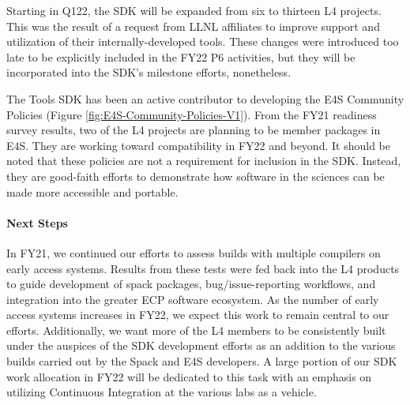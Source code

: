 Starting in Q122, the SDK will be expanded from six to thirteen L4 projects. This was the result of a request from LLNL affiliates to improve support and utilization of their internally-developed tools. These changes were introduced too late to be explicitly included in the FY22 P6 activities, but they will be incorporated into the SDK's milestone efforts, nonetheless.

The Tools SDK has been an active contributor to developing the E4S Community Policies (Figure \ref{fig:E4S-Community-Policies-V1}). From the FY21 readiness survey results, two of the L4 projects are planning to be member packages in E4S. They are working toward compatibility in FY22 and beyond. It should be noted that these policies are not a requirement for inclusion in the SDK. Instead, they are good-faith efforts to demonstrate how software in the sciences can be made more accessible and portable.

\paragraph{Next Steps}
In FY21, we continued our efforts to assess builds with multiple compilers on early access systems. Results from these tests were fed back into the L4 products to guide development of spack packages, bug/issue-reporting workflows, and integration into the greater ECP software ecosystem. As the number of early access systems increases in FY22, we expect this work to remain central to our efforts. Additionally, we want more of the L4 members to be consistently built under the auspices of the SDK development efforts as an addition to the various builds carried out by the Spack and E4S developers. A large portion of our SDK work allocation in FY22 will be dedicated to this task with an emphasis on utilizing Continuous Integration at the various labs as a vehicle.

